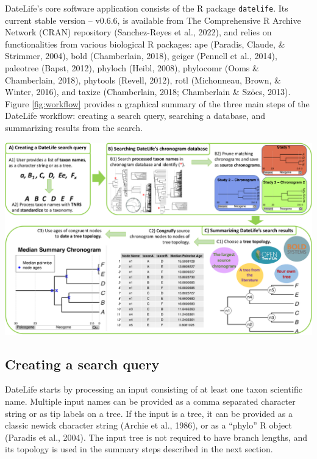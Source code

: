 \documentclass[english,man]{apa6}
\begin{document}
DateLife's core software application consists of the R package \texttt{datelife}. Its current stable version -- v0.6.6, is available from The Comprehensive R Archive Network (CRAN) repository (Sanchez-Reyes et al., 2022), and relies on functionalities from various biological R packages:
ape (Paradis, Claude, \& Strimmer, 2004),
bold (Chamberlain, 2018),
geiger (Pennell et al., 2014),
paleotree (Bapst, 2012),
phyloch (Heibl, 2008),
phylocomr (Ooms \& Chamberlain, 2018),
phytools (Revell, 2012),
rotl (Michonneau, Brown, \& Winter, 2016), and
taxize (Chamberlain, 2018; Chamberlain \& Szöcs, 2013).
Figure \ref{fig:workflow} provides a graphical summary of the three main steps of the DateLife workflow: creating a search query, searching a database, and summarizing results from the search.

\begin{minipage}[t]{17.3cm}
\includegraphics{../figures/figure-workflow/figure1-new.pdf}
\label{fig:workflow}
\end{minipage}

\hypertarget{creating-a-search-query}{%
\subsection{Creating a search query}\label{creating-a-search-query}}

DateLife starts by processing an input consisting of at least one taxon scientific name. Multiple input names can be provided as a comma separated character string or as tip labels on a tree.
If the input is a tree, it can be provided as a classic newick character string (Archie et al., 1986), or as a \enquote{phylo} R object (Paradis et al., 2004).
The input tree is not required to have branch lengths, and its topology is used in the summary steps described in the next section.
\end{document}

